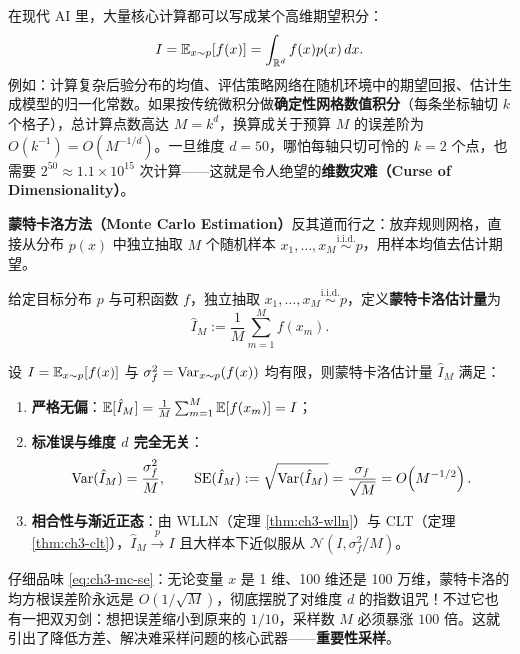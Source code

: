 在现代 AI 里，大量核心计算都可以写成某个高维期望积分：
\[
  I = \mathbb{E}_{x \sim p}[f(x)] = \int_{\mathbb{R}^d} f(x) p(x)\,dx.
\]
例如：计算复杂后验分布的均值、评估策略网络在随机环境中的期望回报、估计生成模型的归一化常数。如果按传统微积分做\textbf{确定性网格数值积分}（每条坐标轴切 $k$ 个格子），总计算点数高达 $M = k^d$，换算成关于预算 $M$ 的误差阶为 $O(k^{-1}) = O(M^{-1/d})$。一旦维度 $d = 50$，哪怕每轴只切可怜的 $k = 2$ 个点，也需要 $2^{50} \approx 1.1 \times 10^{15}$ 次计算——这就是令人绝望的\textbf{维数灾难（Curse of Dimensionality）}。

\textbf{蒙特卡洛方法（Monte Carlo Estimation）}反其道而行之：放弃规则网格，直接从分布 $p(x)$ 中独立抽取 $M$ 个随机样本 $x_1, \dots, x_M \stackrel{\text{i.i.d.}}{\sim} p$，用样本均值去估计期望。

\begin{defBox}
\begin{definition}[蒙特卡洛估计量]
\label{def:ch3-mc}
给定目标分布 $p$ 与可积函数 $f$，独立抽取 $x_1, \dots, x_M \stackrel{\text{i.i.d.}}{\sim} p$，定义\textbf{蒙特卡洛估计量}为
\begin{equation}
  \hat{I}_M := \frac{1}{M}\sum_{m=1}^M f(x_m). \label{eq:ch3-mc}
\end{equation}
\end{definition}
\end{defBox}

\begin{proposition}[蒙特卡洛估计的无偏性与维数无关收敛速度]
\label{prop:ch3-mc}
设 $I = \mathbb{E}_{x\sim p}[f(x)]$ 与 $\sigma_f^2 = \operatorname{Var}_{x\sim p}(f(x))$ 均有限，则蒙特卡洛估计量 $\hat{I}_M$ 满足：
\begin{enumerate}
  \item \textbf{严格无偏}：$\mathbb{E}[\hat{I}_M] = \frac{1}{M}\sum_{m=1}^M \mathbb{E}[f(x_m)] = I$；
  \item \textbf{标准误与维度 $d$ 完全无关}：
  \begin{equation}
    \operatorname{Var}(\hat{I}_M) = \frac{\sigma_f^2}{M},
    \qquad
    \mathrm{SE}(\hat{I}_M) := \sqrt{\operatorname{Var}(\hat{I}_M)} = \frac{\sigma_f}{\sqrt{M}} = O\!\left(M^{-1/2}\right). \label{eq:ch3-mc-se}
  \end{equation}
  \item \textbf{相合性与渐近正态}：由 WLLN（定理 \ref{thm:ch3-wlln}）与 CLT（定理 \ref{thm:ch3-clt}），$\hat{I}_M \xrightarrow{p} I$ 且大样本下近似服从 $\mathcal{N}(I, \sigma_f^2/M)$。
\end{enumerate}
\end{proposition}

仔细品味 \eqref{eq:ch3-mc-se}：无论变量 $x$ 是 1 维、100 维还是 100 万维，蒙特卡洛的均方根误差阶永远是 $O(1/\sqrt{M})$，彻底摆脱了对维度 $d$ 的指数诅咒！不过它也有一把双刃剑：想把误差缩小到原来的 $1/10$，采样数 $M$ 必须暴涨 $100$ 倍。这就引出了降低方差、解决难采样问题的核心武器——\textbf{重要性采样}。

